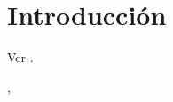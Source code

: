 \chapter{Introducción}
\lipsum[4] Ver \cite{beile2005development}.

\lipsum*[5][1-2]\citep{ala1989presidential}, \lipsum[6] 

\lipsum[7-10]
